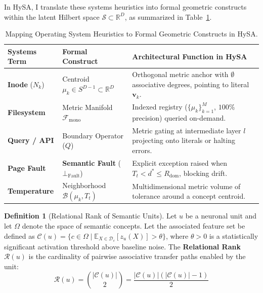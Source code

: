 \documentclass[10pt,twocolumn]{article}
\theoremstyle{definition}
\newtheorem{definition}{Definition}
\begin{document}
In HySA, I translate these systems heuristics into formal geometric constructs within the latent Hilbert space $\mathcal{S} \subset \mathbb{R}^D$, as summarized in Table~\ref{tab:systems_mapping}.

\begin{table}[t]
\centering
\caption{Mapping Operating System Heuristics to Formal Geometric Constructs in HySA.}
\label{tab:systems_mapping}
\vspace{0.12cm}
\scriptsize
\setlength{\tabcolsep}{2.0pt}
\begin{tabular}{@{}p{1.9cm}p{2.3cm}p{3.4cm}@{}}
\toprule
\textbf{Systems Term} & \textbf{Formal Construct} & \textbf{Architectural Function in HySA} \\ \midrule
\textbf{Inode} ($N_k$) & Centroid $\mu_k \in S^{D-1} \subset \mathbb{R}^D$ & Orthogonal metric anchor with $\emptyset$ associative degrees, pointing to literal $\mathbf{v}_k$. \\[3pt]
\textbf{Filesystem} & Metric Manifold $\mathcal{F}_{\mathrm{mono}}$ & Indexed registry ($\{\mu_k\}_{k=1}^M$, $100\%$ precision) queried on-demand. \\[3pt]
\textbf{Query / API} & Boundary Operator ($Q$) & Metric gating at intermediate layer $l$ projecting onto literals or halting errors. \\[3pt]
\textbf{Page Fault} & \textbf{Semantic Fault} ($\bot_{\mathrm{Fault}}$) & Explicit exception raised when $T_t < d^* \le R_{\mathrm{dom}}$, blocking drift. \\[3pt]
\textbf{Temperature} & Neighborhood $\mathcal{B}(\mu_k, T_t)$ & Multidimensional metric volume of tolerance around a concept centroid. \\ \bottomrule
\end{tabular}
\end{table}

\begin{definition}[Relational Rank of Semantic Units]
Let $u$ be a neuronal unit and let $\Omega$ denote the space of semantic concepts. Let the associated feature set be defined as $\mathcal{C}(u) = \{c \in \Omega \mid \mathbb{E}_{X \in \mathcal{D}_c}[z_u(X)] > \theta\}$, where $\theta > 0$ is a statistically significant activation threshold above baseline noise. The \textbf{Relational Rank} $\mathcal{R}(u)$ is the cardinality of pairwise associative transfer paths enabled by the unit:
\begin{equation}
    \mathcal{R}(u) = \binom{|\mathcal{C}(u)|}{2} = \frac{|\mathcal{C}(u)| (|\mathcal{C}(u)| - 1)}{2}
\end{equation}
\end{definition}
\end{document}

